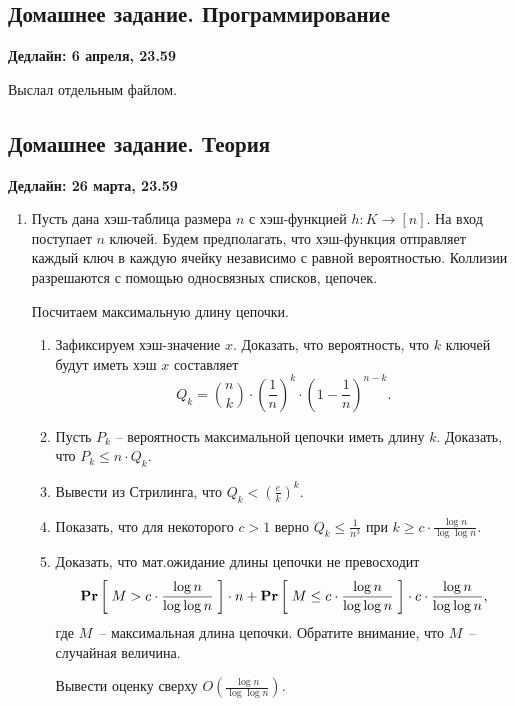 \subsection{Домашнее задание. Программирование}
\textbf{Дедлайн: 6 апреля, 23.59}

Выслал отдельным файлом.

\subsection{Домашнее задание. Теория}
\textbf{Дедлайн: 26 марта, 23.59}

\begin{enumerate}
  \item Пусть дана хэш-таблица размера $n$ с хэш-функцией 
$h : K \rightarrow [n]$. На вход поступает $n$ ключей. Будем предполагать, 
что хэш-функция отправляет каждый ключ в каждую ячейку независимо с равной 
вероятностью. Коллизии разрешаются с помощью односвязных списков, цепочек.
      
      Посчитаем максимальную длину цепочки.
      \begin{enumerate}
          \item Зафиксируем хэш-значение $x$. Доказать, что вероятность, что 
          $k$ ключей будут иметь хэш $x$ составляет
          $$
              Q_k = \binom{n}{k} \cdot \left( \frac{1}{n} \right)^k \cdot  
              \left( 1 - \frac{1}{n} \right)^{n - k}.
          $$
          \item Пусть $P_k$ -- вероятность максимальной цепочки иметь длину $k$.
             Доказать, что $P_k \leq n \cdot Q_k$.
          \item Вывести из Стрилинга, что $Q_k < (\frac{e}{k})^k$.
          \item Показать, что для некоторого $c > 1$ верно $Q_k \leq 
            \frac{1}{n^3}$ при 
          $k \geq c \cdot \frac{\log n}{\log \log n}$.
          \item Доказать, что мат.ожидание длины цепочки не превосходит
          $$
              \underset{}{\textbf{Pr}}\left[ \;  M > c \cdot \frac{\log n}{\log \log n}  \;\right] \cdot n + 
              \underset{}{\textbf{Pr}}\left[ \;  M \leq c \cdot \frac{\log n}{\log \log n}  \;\right] \cdot c 
              \cdot \frac{\log n}{\log \log n},
          $$
          где $M$~-- максимальная длина цепочки. Обратите внимание, что $M$~--
          случайная величина.
          
          Вывести оценку сверху $O(\frac{\log n}{\log \log n})$.
      \end{enumerate}
  
\end{enumerate}

